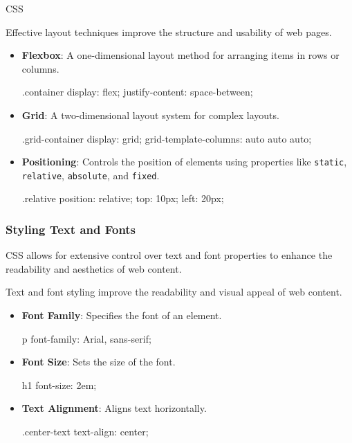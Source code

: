 \begin{notes}{CSS}
\begin{highlight}
        Effective layout techniques improve the structure and usability of web pages.
        
        \begin{itemize}
            \item \textbf{Flexbox}: A one-dimensional layout method for arranging items in rows or columns.
    \begin{code}[CSS]
    .container {
        display: flex;
        justify-content: space-between;
    }
    \end{code}
            \item \textbf{Grid}: A two-dimensional layout system for complex layouts.
    \begin{code}[CSS]
    .grid-container {
        display: grid;
        grid-template-columns: auto auto auto;
    }
    \end{code}
            \item \textbf{Positioning}: Controls the position of elements using properties like \texttt{static}, \texttt{relative}, \texttt{absolute}, and \texttt{fixed}.
    \begin{code}[CSS]
    .relative {
        position: relative;
        top: 10px;
        left: 20px;
    }
    \end{code}
        \end{itemize}
    
    \end{highlight}
    
    \subsubsection*{Styling Text and Fonts}
    
    CSS allows for extensive control over text and font properties to enhance the readability and aesthetics of web content.
    
    \begin{highlight}
    
        Text and font styling improve the readability and visual appeal of web content.
        
        \begin{itemize}
            \item \textbf{Font Family}: Specifies the font of an element.
    \begin{code}[CSS]
    p {
        font-family: Arial, sans-serif;
    }
    \end{code}
            \item \textbf{Font Size}: Sets the size of the font.
            \begin{code}[CSS]
            h1 {
                font-size: 2em;
            }
    \end{code}
    \item \textbf{Text Alignment}: Aligns text horizontally.
    \begin{code}[CSS]
    .center-text {
        text-align: center;
    }
    \end{code}
        \end{itemize}
    

\end{highlight}
\end{notes}
